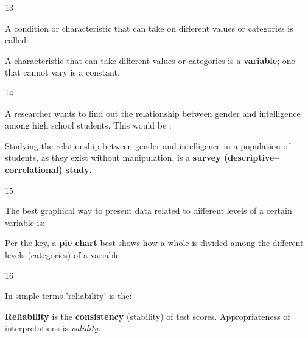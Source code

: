 \begin{question}{13}
{A condition or characteristic that can take on different values or categories is called:\par}
\begin{explain}
A characteristic that can take different values or categories is a \textbf{variable}; one that cannot vary is a constant.
\end{explain}
\end{question}

\begin{question}{14}
{A researcher wants to find out the relationship between gender and intelligence among high school students. This would be :\par}
\begin{explain}
Studying the relationship between gender and intelligence in a population of students, as they exist without manipulation, is a \textbf{survey (descriptive--correlational) study}.
\end{explain}
\end{question}

\begin{question}{15}
{The best graphical way to present data related to different levels of a certain variable is:\par}
\begin{explain}
Per the key, a \textbf{pie chart} best shows how a whole is divided among the different levels (categories) of a variable.
\end{explain}
\end{question}

\begin{question}{16}
{In simple terms 'reliability' is the:\par}
\begin{explain}
\textbf{Reliability} is the \textbf{consistency} (stability) of test scores. Appropriateness of interpretations is \emph{validity}.
\end{explain}
\end{question}

